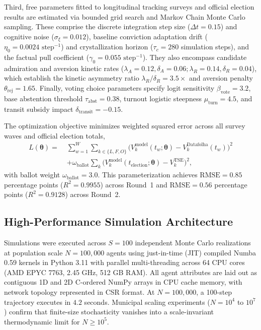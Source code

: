 \documentclass[a4paper,fleqn]{cas-dc}
\begin{document}
Third, free parameters fitted to longitudinal tracking surveys and official election results are estimated via bounded grid search and Markov Chain Monte Carlo sampling. These comprise the discrete integration step size ($\Delta t = 0.15$) and cognitive noise ($\sigma_{\xi} = 0.012$), baseline conviction adaptation drift ($\eta_0 = 0.0024 \text{ step}^{-1}$) and crystallization horizon ($\tau_c = 280$ simulation steps), and the factual pull coefficient ($\gamma_0 = 0.055 \text{ step}^{-1}$). They also encompass candidate admiration and aversion kinetic rates ($\lambda_A = 0.12, \delta_A = 0.06; \lambda_R = 0.14, \delta_R = 0.04$), which establish the kinetic asymmetry ratio $\lambda_R / \delta_R = 3.5\times$ and aversion penalty $\theta_{\mathrm{rej}} = 1.65$. Finally, voting choice parameters specify logit sensitivity $\beta_{\mathrm{vote}} = 3.2$, base abstention threshold $\tau_{\mathrm{abst}} = 0.38$, turnout logistic steepness $\mu_{\mathrm{turn}} = 4.5$, and transit subsidy impact $\delta_{\mathrm{transit}} = -0.15$.

The optimization objective minimizes weighted squared error across all survey waves and official election totals,
\begin{equation}
\begin{aligned}
    L(\boldsymbol{\theta}) = \; & \sum_{w=1}^W \sum_{k \in \{L, F, O\}} \big(V_k^{\mathrm{model}}(t_w; \boldsymbol{\theta}) - V_k^{\mathrm{Datafolha}}(t_w)\big)^2 \\
    & + \omega_{\mathrm{ballot}} \sum_{k} \big(V_k^{\mathrm{model}}(t_{\mathrm{election}}; \boldsymbol{\theta}) - V_k^{\mathrm{TSE}}\big)^2,
\end{aligned}
\label{eq:methods_loss_function}
\end{equation}
with ballot weight $\omega_{\mathrm{ballot}} = 3.0$. This parameterization achieves $\mathrm{RMSE} = 0.85$ percentage points ($R^2 = 0.9955$) across Round~1 and $\mathrm{RMSE} = 0.56$ percentage points ($R^2 = 0.9128$) across Round~2.

\subsection{High-Performance Simulation Architecture}
\label{subsec:hpc}
Simulations were executed across $S = 100$ independent Monte Carlo realizations at population scale $N = 100{,}000$ agents using just-in-time (JIT) compiled Numba 0.59 kernels in Python 3.11 with parallel multi-threading across 64 CPU cores (AMD EPYC 7763, 2.45 GHz, 512 GB RAM). All agent attributes are laid out as contiguous 1D and 2D C-ordered NumPy arrays in CPU cache memory, with network topology represented in CSR format. At $N = 100{,}000$, a 100-step trajectory executes in $4.2$ seconds. Municipal scaling experiments ($N = 10^4$ to $10^7$) confirm that finite-size stochasticity vanishes into a scale-invariant thermodynamic limit for $N \ge 10^5$.
\end{document}
